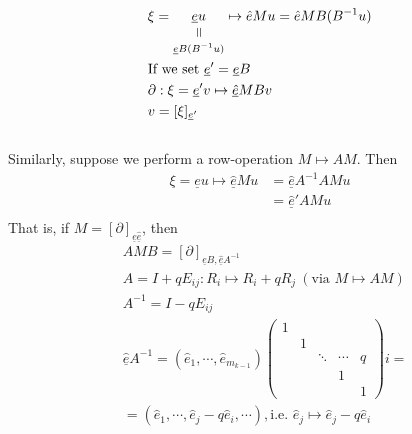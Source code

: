 \documentclass[11pt,a4paper]{report}
\newcommand{\verteq}{\rotatebox{90}{$\,=$}}
\newcommand{\equalto}[2]{\underset{\scriptstyle\overset{\mkern4mu\verteq}{#2}}{#1}}
\begin{document}
              \begin{align*}
                &\xi = \equalto{\underline{e}u}{\underline{e} B (B^{-1}u)} \mapsto \hat{e} M u = \hat{e} M B (B^{-1}u)\\
                &\textrm{If we set } \underline{e}' = \underline{e}B\\
                &\partial: \xi = \underline{e}' v \mapsto \underline{\hat{e}} MB v\\
                &v = [\xi]_{\underline{e}'}
              \end{align*}
              \\
              Similarly, suppose we perform a row-operation $M \mapsto AM$. Then
              \begin{align*}
                \xi = \underline{e}u \mapsto \underline{\hat{e}}Mu &= \underline{\hat{e}}A^{-1}AMu\\
                                                           &= \underline{\hat{e}}'AMu\\
              \end{align*}
              That is, if $M = [\partial]_{\underline{e}\underline{\hat{e}}}$, then
              \begin{align*}
                &AMB = [\partial]_{\underline{e}B, \underline{\hat{e}}A^{-1}}\\
                &A = I + qE_{ij}: R_i \mapsto R_i + qR_j \ (\textrm{via } M \mapsto AM)\\
                &A^{-1} = I - qE_{ij}\\
                &\underline{\hat{e}} A^{-1} = (\hat{e}_1, \cdots, \hat{e}_{m_{k-1}})\begin{pmatrix}1 &&&& \\ & 1 &&& \\ && \ddots & \cdots & q\\ &&& 1 &\\ &&&& 1\end{pmatrix}i =\\
                &= (\hat{e}_1, \cdots, \hat{e}_j - q\hat{e}_i, \cdots), \textrm{i.e. } \hat{e}_j \mapsto \hat{e}_j - q\hat{e}_i\\
              \end{align*}
\end{document}
